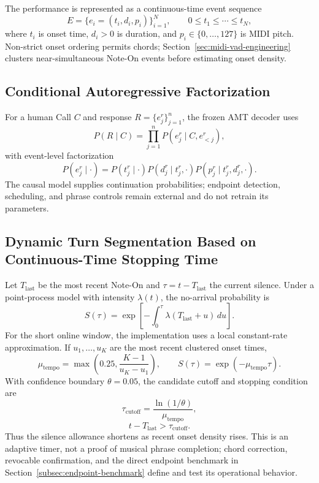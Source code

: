 \documentclass[11pt,a4paper]{article}
\begin{document}
The performance is represented as a continuous-time event sequence
\begin{equation}
E=\{e_i=(t_i,d_i,p_i)\}_{i=1}^{N},\qquad
0\leq t_1\leq\cdots\leq t_N,
\end{equation}
where $t_i$ is onset time, $d_i>0$ is duration, and $p_i\in\{0,\ldots,127\}$ is MIDI pitch. Non-strict onset ordering permits chords; Section~\ref{sec:midi-vad-engineering} clusters near-simultaneous Note-On events before estimating onset density.

\subsection{Conditional Autoregressive Factorization}

For a human Call $C$ and response $R=\{e_j^r\}_{j=1}^{n}$, the frozen AMT decoder uses
\begin{equation}
P(R\mid C)=\prod_{j=1}^{n}P(e_j^r\mid C,e_{<j}^r),
\end{equation}
with event-level factorization
\begin{equation}
P(e_j^r\mid\cdot)=P(t_j^r\mid\cdot)
P(d_j^r\mid t_j^r,\cdot)
P(p_j^r\mid t_j^r,d_j^r,\cdot).
\end{equation}
The causal model supplies continuation probabilities; endpoint detection, scheduling, and phrase controls remain external and do not retrain its parameters.

\subsection{Dynamic Turn Segmentation Based on Continuous-Time Stopping Time}

Let $T_{\mathrm{last}}$ be the most recent Note-On and $\tau=t-T_{\mathrm{last}}$ the current silence. Under a point-process model with intensity $\lambda(t)$, the no-arrival probability is \citep{daley2003pointprocesses}
\begin{equation}
S(\tau)=\exp\left[-\int_0^{\tau}\lambda(T_{\mathrm{last}}+u)\,du\right].
\end{equation}
For the short online window, the implementation uses a local constant-rate approximation. If $u_1,\ldots,u_K$ are the most recent clustered onset times,
\begin{equation}
\mu_{\mathrm{tempo}}=
\max\left(0.25,\frac{K-1}{u_K-u_1}\right),
\qquad
S(\tau)=\exp(-\mu_{\mathrm{tempo}}\tau).
\end{equation}
With confidence boundary $\theta=0.05$, the candidate cutoff and stopping condition are
\begin{equation}
\tau_{\mathrm{cutoff}}=\frac{\ln(1/\theta)}{\mu_{\mathrm{tempo}}},
\label{eq:dynamic-cutoff}
\end{equation}
\begin{equation}
t-T_{\mathrm{last}}>\tau_{\mathrm{cutoff}}.
\label{eq:endpoint-condition}
\end{equation}
Thus the silence allowance shortens as recent onset density rises. This is an adaptive timer, not a proof of musical phrase completion; chord correction, revocable confirmation, and the direct endpoint benchmark in Section~\ref{subsec:endpoint-benchmark} define and test its operational behavior.
\end{document}
